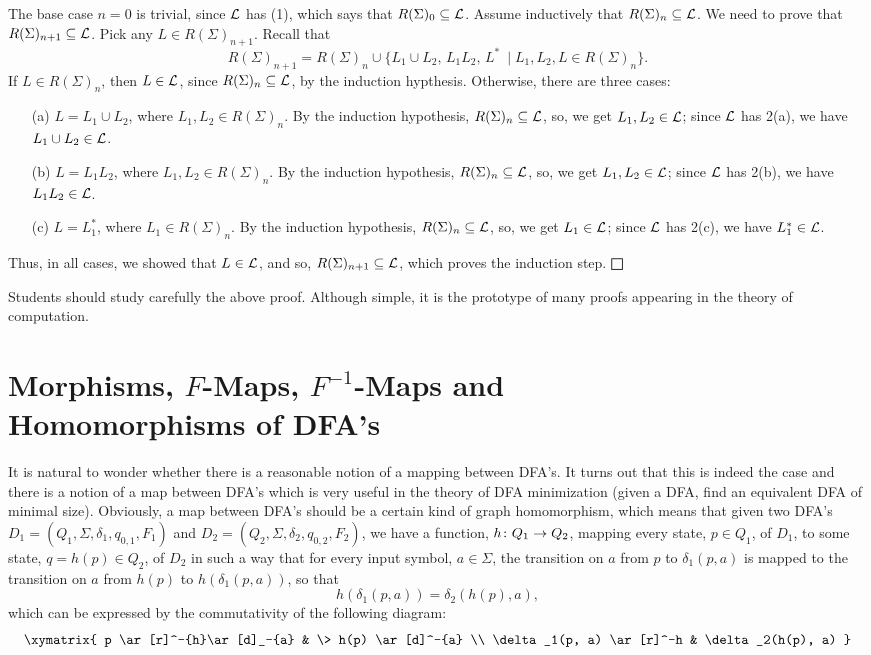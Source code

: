 \medskip
The base case $n = 0$ is trivial, since
${\cal L}$ has (1), which says that
$R(\Sigma)_0 \subseteq {\cal L}$.
Assume inductively that $R(\Sigma)_n \subseteq {\cal L}$.
We need to prove that  $R(\Sigma)_{n+1} \subseteq {\cal L}$.
Pick any $L\in R(\Sigma)_{n+1}$. Recall that
\[
R(\Sigma)_{n+1} =  R(\Sigma)_{n}\cup \{L_1\cup L_2,\, L_1L_2,\, L^*\ \mid 
 L_1, L_2, L \in  R(\Sigma)_{n}\}.
\]
If $L\in R(\Sigma)_n$, then $L\in {\cal L}$, since
$R(\Sigma)_n \subseteq {\cal L}$, by the induction hypthesis.
Otherwise, there are three cases:
\begin{enumerate}
\item[(a)]
$L = L_1\cup L_2$, where $L_1, L_2\in R(\Sigma)_n$.
By the induction hypothesis, $R(\Sigma)_n \subseteq {\cal L}$, 
so, we get $L_1, L_2\in {\cal L}$; since ${\cal L}$
has 2(a), we have $L_1\cup L_2\in {\cal L}$.
\item[(b)]
$L = L_1  L_2$, where $L_1, L_2\in R(\Sigma)_n$.
By the induction hypothesis, $R(\Sigma)_n \subseteq {\cal L}$, 
so, we get $L_1, L_2\in {\cal L}$; since ${\cal L}$
has 2(b), we have $L_1  L_2\in {\cal L}$.
\item[(c)]
$L = L_1^*$, where $L_1\in R(\Sigma)_n$.
By the induction hypothesis, $R(\Sigma)_n \subseteq {\cal L}$, 
so, we get $L_1\in {\cal L}$; since ${\cal L}$
has 2(c), we have $L_1^*\in {\cal L}$.
\end{enumerate}
Thus, in all cases, we showed that $L\in {\cal L}$, and so,
 $R(\Sigma)_{n+1} \subseteq {\cal L}$, 
which proves the induction step.
$\bigsquare$

\medskip
Students should study carefully the above proof.
Although simple, it is the prototype of many proofs
appearing in the theory of computation.

\section[Morphisms, $F$-Maps, $F^{-1}$-Maps and 
Homomorphisms of DFA's]
{Morphisms, $F$-Maps, $F^{-1}$-Maps and \\
Homomorphisms of DFA's}
\label{DFAmaps}
It is natural to wonder whether there is a reasonable
notion of a mapping between DFA's. It turns out that this is indeed
the case and there is a  notion of a map between
DFA's which is very useful
in the theory of DFA minimization (given a DFA, find
an equivalent DFA of minimal size).
Obviously, a map between DFA's should be
a certain kind of graph homomorphism, which means that 
given two DFA's 
$D_1 = (Q_1, \Sigma, \delta_1, q_{0, 1}, F_1)$ and
$D_2 = (Q_2, \Sigma, \delta_2, q_{0, 2}, F_2)$, we have a
function, $h\colon Q_1\rightarrow Q_2$, mapping every state,
$p\in Q_1$, of $D_1$, to some state, $q = h(p)\in Q_2$, of $D_2$ in such a way
that for every input symbol, $a\in \Sigma$,
the transition on $a$ from $p$ to $\delta_1(p, a)$ is mapped to the
transition on $a$ from $h(p)$ to $h(\delta_1(p, a))$, 
so that 
\[
h(\delta_1(p, a)) = \delta_2(h(p), a),
\]
which can be expressed by the commutativity of the following
diagram:
\[
\xymatrix{
p \ar[r]^-{h}\ar[d]_-{a} & \> h(p) \ar[d]^-{a} \\
\delta_1(p, a) \ar[r]^-h &  \delta_2(h(p), a) 
}
\]

